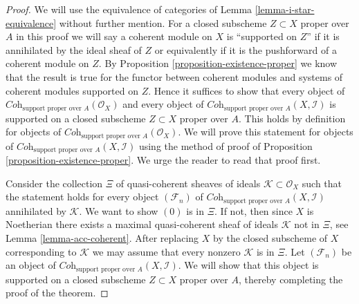 \begin{proof}
We will use the equivalence of categories of
Lemma \ref{lemma-i-star-equivalence}
without further mention.
For a closed subscheme $Z \subset X$ proper over $A$
in this proof we will say a coherent module on $X$ is
``supported on $Z$'' if it is annihilated by the ideal
sheaf of $Z$ or equivalently if it is the pushforward
of a coherent module on $Z$.
By Proposition \ref{proposition-existence-proper} we know
that the result is true for
the functor between coherent modules and systems of coherent
modules supported on $Z$. Hence it suffices to show that
every object of
$\textit{Coh}_{\text{support proper over }A}(\mathcal{O}_X)$
and every object of
$\textit{Coh}_{\text{support proper over }A}(X, \mathcal{I})$ is
supported on a closed subscheme $Z \subset X$ proper over $A$.
This holds by definition for objects of
$\textit{Coh}_{\text{support proper over }A}(\mathcal{O}_X)$.
We will prove this statement for objects of
$\textit{Coh}_{\text{support proper over }A}(X, \mathcal{I})$
using the method of proof of Proposition \ref{proposition-existence-proper}.
We urge the reader to read that proof first.

\medskip\noindent
Consider the collection $\Xi$ of quasi-coherent sheaves of ideals
$\mathcal{K} \subset \mathcal{O}_X$ such that the statement holds
for every object $(\mathcal{F}_n)$ of
$\textit{Coh}_{\text{support proper over }A}(X, \mathcal{I})$
annihilated by $\mathcal{K}$. We want to show $(0)$ is in $\Xi$.
If not, then since $X$ is Noetherian there exists a maximal
quasi-coherent sheaf of ideals $\mathcal{K}$ not in $\Xi$, see
Lemma \ref{lemma-acc-coherent}.
After replacing $X$ by the closed subscheme of $X$
corresponding to $\mathcal{K}$ we may assume that every nonzero
$\mathcal{K}$ is in $\Xi$. Let $(\mathcal{F}_n)$ be an object of
$\textit{Coh}_{\text{support proper over }A}(X, \mathcal{I})$.
We will show that this object is supported on a closed subscheme
$Z \subset X$ proper over $A$, thereby completing the
proof of the theorem.


\end{proof}
